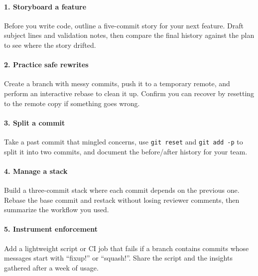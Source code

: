 \paragraph{1. Storyboard a feature} Before you write code, outline a five-commit story for your next feature. Draft subject lines and validation notes, then compare the final history against the plan to see where the story drifted.

\paragraph{2. Practice safe rewrites} Create a branch with messy commits, push it to a temporary remote, and perform an interactive rebase to clean it up. Confirm you can recover by resetting to the remote copy if something goes wrong.

\paragraph{3. Split a commit} Take a past commit that mingled concerns, use \texttt{git reset} and \texttt{git add -p} to split it into two commits, and document the before/after history for your team.

\paragraph{4. Manage a stack} Build a three-commit stack where each commit depends on the previous one. Rebase the base commit and restack without losing reviewer comments, then summarize the workflow you used.

\paragraph{5. Instrument enforcement} Add a lightweight script or CI job that fails if a branch contains commits whose messages start with ``fixup!'' or ``squash!''. Share the script and the insights gathered after a week of usage.
